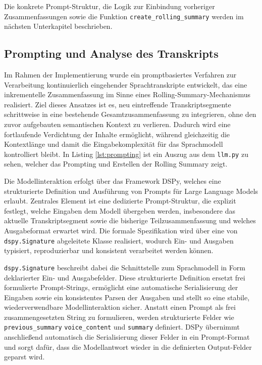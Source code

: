 Die konkrete Prompt-Struktur, die Logik zur Einbindung vorheriger Zusammenfassungen sowie die Funktion \texttt{create\_rolling\_summary} werden im nächsten Unterkapitel beschrieben.

\newpage
\subsection{Prompting und Analyse des Transkripts}
Im Rahmen der Implementierung wurde ein promptbasiertes Verfahren zur Verarbeitung kontinuierlich eingehender Sprachtranskripte entwickelt, das eine inkrementelle Zusammenfassung im Sinne eines Rolling-Summary-Mechanismus realisiert. Ziel dieses Ansatzes ist es, neu eintreffende Transkriptsegmente schrittweise in eine bestehende Gesamtzusammenfassung zu integrieren, ohne den zuvor aufgebauten semantischen Kontext zu verlieren. Dadurch wird eine fortlaufende Verdichtung der Inhalte ermöglicht, während gleichzeitig die Kontextlänge und damit die Eingabekomplexität für das Sprachmodell kontrolliert bleibt. In Listing \ref{lst:prompting} ist ein Auszug aus dem \texttt{llm.py} zu sehen, welcher das Prompting und Erstellen der Rolling Summary zeigt.

Die Modellinteraktion erfolgt über das Framework DSPy, welches eine strukturierte Definition und Ausführung von Prompts für Large Language Models erlaubt. Zentrales Element ist eine dedizierte Prompt-Struktur, die explizit festlegt, welche Eingaben dem Modell übergeben werden, insbesondere das aktuelle Transkriptsegment sowie die bisherige Teilzusammenfassung und welches Ausgabeformat erwartet wird. Die formale Spezifikation wird über eine von \texttt{dspy.Signature} abgeleitete Klasse realisiert, wodurch Ein- und Ausgaben typisiert, reproduzierbar und konsistent verarbeitet werden können.

\texttt{dspy.Signature} beschreibt dabei die Schnittstelle zum Sprachmodell in Form deklarierter Ein- und Ausgabefelder. Diese strukturierte Definition ersetzt frei formulierte Prompt-Strings, ermöglicht eine automatische Serialisierung der Eingaben sowie ein konsistentes Parsen der Ausgaben und stellt so eine stabile, wiederverwendbare Modellinteraktion sicher. Anstatt einen Prompt als frei zusammengesetzten String zu formulieren, werden strukturierte Felder wie \texttt{previous\_summary} \texttt{voice\_content} und \texttt{summary} definiert. DSPy übernimmt anschließend automatisch die Serialisierung dieser Felder in ein Prompt-Format und sorgt dafür, dass die Modellantwort wieder in die definierten Output-Felder geparst wird.

